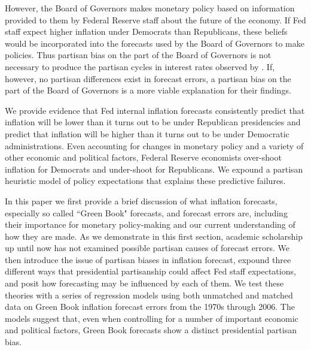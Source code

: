 \documentclass[a4paper]{article}\usepackage{graphicx, color}
\begin{document}


However, the Board of Governors makes monetary policy based on information provided to them by Federal Reserve staff about the future of the economy. If Fed staff expect higher inflation under Democrats than Republicans, these beliefs would be incorporated into the forecasts used by the Board of Governors to make policies. Thus partisan bias on the part of the Board of Governors is not necessary to produce the partisan cycles in interest rates observed by \cite{Clark2012}. If, however, no partisan differences exist in forecast errors, a partisan bias on the part of the Board of Governors is a more viable explanation for their findings.

We provide evidence that Fed internal inflation forecasts consistently predict that inflation will be lower than it turns out to be under Republican presidencies and predict that inflation will be higher than it turns out to be under Democratic administrations. Even accounting for changes in monetary policy and a variety of other economic and political factors, Federal Reserve economists over-shoot inflation for Democrats and under-shoot for Republicans. We expound a partisan heuristic model of policy expectations that explains these predictive failures.

In this paper we first provide a brief discussion of what inflation forecasts, especially so called ``Green Book" forecasts, and forecast errors are, including their importance for monetary policy-making and our current understanding of how they are made. As we demonstrate in this first section, academic scholarship up until now has not examined possible partisan causes of forecast errors. We then introduce the issue of partisan biases in inflation forecast, expound three different ways that presidential partisanship could affect Fed staff expectations, and posit how forecasting may be influenced by each of them. We test these theories with a series of regression models using both unmatched and matched data on Green Book inflation forecast errors from the 1970s through 2006. The models suggest that, even when controlling for a number of important economic and political factors, Green Book forecasts show a distinct presidential partisan bias. 
\end{document}
